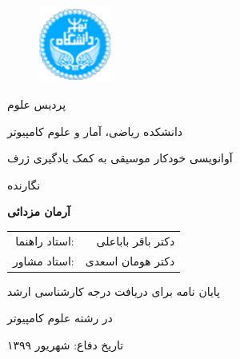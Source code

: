 \begin{figure}
    \centering
    \includegraphics[height=2.5cm]{./statics/UT-Logo.pdf}
\end{figure}

\begin{center}
    پردیس علوم

    دانشکده ریاضی، آمار و علوم کامپیوتر
\end{center}

\vspace{1cm}

\begin{center}
    \huge{آوانویسی خودکار موسیقی به کمک یادگیری ژرف}
\end{center}

\vspace{1cm}

\begin{center}
    نگارنده
\end{center}
\begin{center}
    \textbf{آرمان مزدائی}
\end{center}

\begin{center}
    \begin{tabular}{rr}
        استاد راهنما:& دکتر باقر باباعلی
        \\
        استاد مشاور:& دکتر هومان اسعدی
    \end{tabular}
\end{center}

\vspace{3cm}
\begin{center}
    پایان نامه برای دریافت درجه کارشناسی ارشد

    در رشته علوم کامپیوتر
\end{center}

\begin{center}
تاریخ دفاع: شهریور ۱۳۹۹
\end{center}

\pagestyle{empty}
\pagenumbering{}